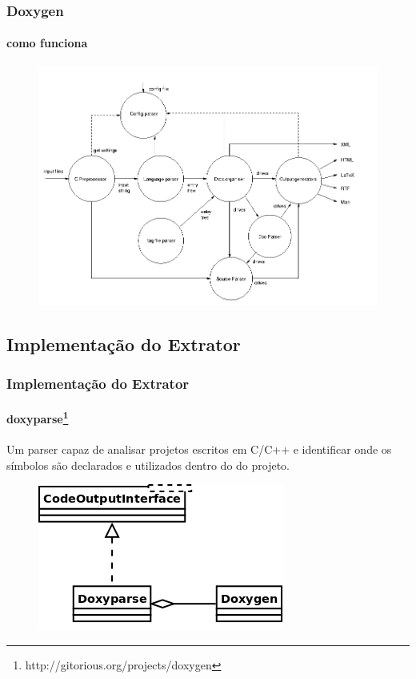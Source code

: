 \documentclass{beamer}
\begin{document}
\begin{frame}
\frametitle{Doxygen}
\framesubtitle{como funciona}
 \begin{figure}[h]
 \center
 \includegraphics[scale=0.25]{imagens/doxygen-internals-flow}
 \label{fig:doxygen-internals-flow}
 \end{figure}
\end{frame}

\subsection{Implementação do Extrator}

\begin{frame}
\frametitle{Implementação do Extrator}
\framesubtitle{doxyparse\footnote{http://gitorious.org/projects/doxygen}}
 Um parser capaz de analisar projetos escritos em C/C++ e identificar onde os
 símbolos são declarados e utilizados dentro do do projeto.
 \begin{figure}[h]
 \center
 \includegraphics[scale=0.3]{imagens/doxyparse-diagram}
 \label{doxyparse-diagram}
 \end{figure}
\end{frame}
\end{document}
